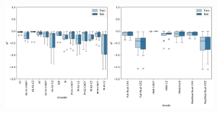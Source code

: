 \documentclass[journal=jacsat,manuscript=article]{achemso}
\begin{document}
\begin{figure}[H]
\begin{subfigure}[b]{0.49\textwidth}
		\caption{}
		\label{fig:16BSE_heatplots}
	\end{subfigure}
	\hfill
	\begin{subfigure}[b]{0.49\textwidth}
		\centering
		\includegraphics[width=\linewidth]{../images/BSE/sixteenqubit/BSE_boxplots}
		\caption{}
		\label{fig:16BSE_boxplots}
	\end{subfigure}
	\caption{}
	\label{fig:BSEboxandheat}	
\end{figure}
\end{document}
